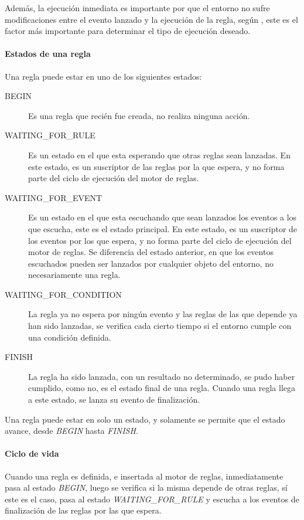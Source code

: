 Además, la ejecución inmediata es importante por que el entorno no sufre
modificaciones entre el evento lanzado y la ejecución de la regla, según
\cite{bailey2004event}, este es el factor más importante para determinar el tipo
de ejecución deseado.



\paragraph{Estados de una regla}

Una regla puede estar en uno de los siguientes estados:

\begin{description}
\item[BEGIN] Es una regla que recién fue creada, no realiza ninguna
	acción.
\item[WAITING\_FOR\_RULE] Es un estado en el que esta esperando que otras reglas
	sean lanzadas. En este estado, es un suscriptor de las reglas por la que
	espera, y no forma parte del ciclo de ejecución del motor de reglas.
\item[WAITING\_FOR\_EVENT] Es un estado en el que esta escuchando que sean
	lanzados los eventos a los que escucha, este es el estado principal. En
	este estado, es un suscriptor de los eventos por los que espera, y no
	forma parte del ciclo de ejecución del motor de reglas. Se diferencia
	del estado anterior, en que los eventos escuchados pueden ser lanzados
	por cualquier objeto del entorno, no necesariamente una regla.
\item[WAITING\_FOR\_CONDITION] La regla ya no espera por ningún evento y las
	reglas de las que depende ya han sido lanzadas, se verifica cada cierto
	tiempo si el entorno cumple con una condición definida. 
\item[FINISH] La regla ha sido lanzada, con un resultado no determinado, se pudo
	haber cumplido, como no, es el estado final de una regla. Cuando una
	regla llega a este estado, se lanza su evento de finalización.
\end{description}

Una regla puede estar en solo un estado, y solamente se permite que el estado
avance, desde \emph{BEGIN} hasta \emph{FINISH}.


\paragraph{Ciclo de vida}

Cuando una regla es definida, e insertada al motor de reglas, inmediatamente
pasa al estado \emph{BEGIN}, luego se verifica si la misma depende de otras
reglas, sí este es el caso, pasa al estado \emph{WAITING\_FOR\_RULE} y escucha a
los eventos de finalización de las reglas por las que espera.

